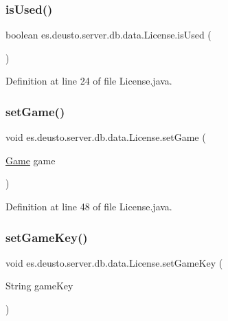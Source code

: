 \subsubsection{\texorpdfstring{is\+Used()}{isUsed()}}
{\footnotesize\ttfamily boolean es.\+deusto.\+server.\+db.\+data.\+License.\+is\+Used (\begin{DoxyParamCaption}{ }\end{DoxyParamCaption})}



Definition at line 24 of file License.\+java.

\mbox{\label{classes_1_1deusto_1_1server_1_1db_1_1data_1_1_license_ab3173591006e39649097242e4a1045cb}} 
\subsubsection{\texorpdfstring{set\+Game()}{setGame()}}
{\footnotesize\ttfamily void es.\+deusto.\+server.\+db.\+data.\+License.\+set\+Game (\begin{DoxyParamCaption}\item[{\hyperlink{classes_1_1deusto_1_1server_1_1db_1_1data_1_1_game}{Game}}]{game }\end{DoxyParamCaption})}



Definition at line 48 of file License.\+java.

\mbox{\label{classes_1_1deusto_1_1server_1_1db_1_1data_1_1_license_a985a3635a2a29f961610cdd615af09a8}} 
\subsubsection{\texorpdfstring{set\+Game\+Key()}{setGameKey()}}
{\footnotesize\ttfamily void es.\+deusto.\+server.\+db.\+data.\+License.\+set\+Game\+Key (\begin{DoxyParamCaption}\item[{String}]{game\+Key }\end{DoxyParamCaption})}



